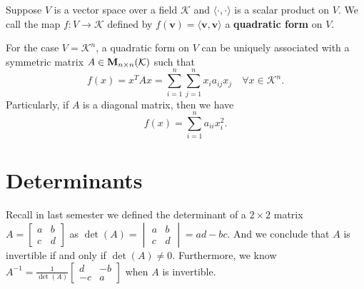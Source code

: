     \begin{definitionenv}
        Suppose $V$ is a vector space over a field $\mathcal{K}$ and $\langle \cdot, \cdot \rangle$ is a scalar product on $V$. We call the map $f: V \to \mathcal{K}$ defined by $f(\bm{v}) = \langle \bm{v}, \bm{v} \rangle$ a \textbf{quadratic form} on $V$.
    \end{definitionenv}
    \begin{exampleenv}
        For the case $V=\mathcal{K}^n$, a quadratic form on $V$ can be uniquely associated with a symmetric matrix $A\in \mathbf{M}_{n \times n}(\mathcal{K})$ such that
        \[
        f(x) = x^T A x = \sum_{i=1}^{n}\sum_{j=1}^{n} x_i a_{ij} x_j \quad \forall x \in \mathcal{K}^n.
        \]
        Particularly, if $A$ is a diagonal matrix, then we have
        \[
        f(x) = \sum_{i=1}^{n} a_{ii} x_i^2.
        \]
    \end{exampleenv}
    
    \section{Determinants}
    Recall in last semester we defined the determinant of a $2\times 2$ matrix $\displaystyle A = \begin{bmatrix} a & b \\ c & d \end{bmatrix}$ as $\displaystyle \det(A) = \begin{vmatrix} a & b \\ c & d \end{vmatrix} = ad - bc$. And we conclude that $A$ is invertible if and only if $\det(A) \neq 0$. Furthermore, we know $\displaystyle A^{-1} = \frac{1}{\det(A)} \begin{bmatrix} d & -b \\ -c & a \end{bmatrix}$ when $A$ is invertible.

